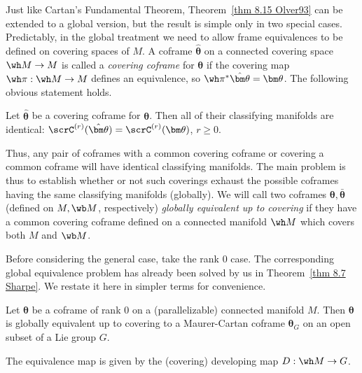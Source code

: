 \PRLsep

Just like Cartan's Fundamental Theorem, Theorem~\ref{thm 8.15 Olver93} can be extended to a global version, but the result is simple only in two special cases. Predictably, in the global treatment we need to allow frame equivalences to be defined on covering spaces of $M$. A coframe $\hat{\bm\theta}$ on a connected covering space $\wh M\to M$ is called a \emph{covering coframe} for $\bm\theta$ if the covering map $\wh\pi:\wh M\to M$ defines an equivalence, so $\wh\pi^\ast \hat{\bm\theta}=\bm\theta$. The following obvious statement holds.

\begin{prop}
    Let $\hat{\bm\theta}$ be a covering coframe for $\bm\theta$. Then all of their classifying manifolds are identical: $\scrC^{(r)}(\hat{\bm\theta})=\scrC^{(r)}(\bm\theta)$, $r\geq 0$.
\end{prop}

Thus, any pair of coframes with a common covering coframe or covering a common coframe will have identical classifying manifolds. The main problem is thus to establish whether or not such coverings exhaust the possible coframes having the same classifying manifolds (globally). We will call two coframes $\bm\theta,\bar{\bm\theta}$ (defined on $M,\wb M$, respectively) \emph{globally equivalent up to covering} if they have a common covering coframe defined on a connected manifold $\wh M$ which covers both $M$ and $\wb M$. 

Before considering the general case, take the rank $0$ case. The corresponding global equivalence problem has already been solved by us in Theorem~\ref{thm 8.7 Sharpe}. We restate it here in simpler terms for convenience.

\begin{thm}
    Let $\bm\theta$ be a coframe of rank $0$ on a (parallelizable) connected manifold $M$. Then $\bm\theta$ is globally equivalent up to covering to a Maurer-Cartan coframe $\bm{\theta}_G$ on an open subset of a Lie group $G$.
\end{thm}

The equivalence map is given by the (covering) developing map $D:\wh M\to G$. 

